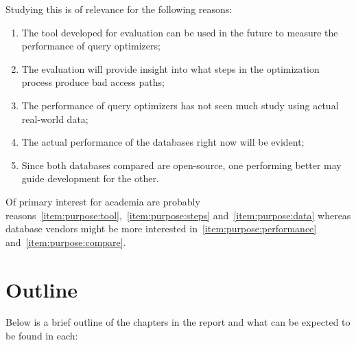 Studying this is of relevance for the following reasons:
\begin{enumerate}
\item\label{item:purpose:tool} The tool developed for evaluation can be used
  in the future to measure the performance of query optimizers;
\item\label{item:purpose:steps} The evaluation will provide insight into
  what steps in the optimization process produce bad access paths;
\item\label{item:purpose:data} The performance of query optimizers has not
  seen much study using actual real-world data;
\item\label{item:purpose:performance} The actual performance of the
  databases right now will be evident;
\item\label{item:purpose:compare} Since both databases compared are
  open-source, one performing better may guide development for the other.
\end{enumerate}

Of primary interest for academia are probably
reasons~\ref{item:purpose:tool},~\ref{item:purpose:steps}
and~\ref{item:purpose:data} whereas database vendors might be more interested
in~\ref{item:purpose:performance} and~\ref{item:purpose:compare}.

\section{Outline}
Below is a brief outline of the chapters in the report and what can be expected
to be found in each:

